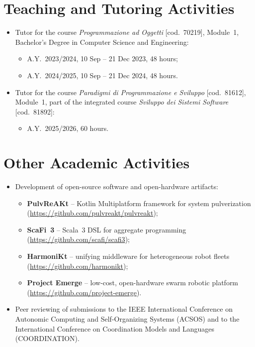\documentclass[a4paper,11pt]{article}
\begin{document}
\section{Teaching and Tutoring Activities}
\label{sec:teaching}

\begin{itemize}
  \item Tutor for the course \emph{Programmazione ad Oggetti} [cod.\ 70219], Module~1, Bachelor's Degree in Computer Science and Engineering:
  \begin{itemize}
    \item A.Y.\ 2023/2024, 10 Sep -- 21 Dec 2023, 48 hours;
    \item A.Y.\ 2024/2025, 10 Sep -- 21 Dec 2024, 48 hours.
  \end{itemize}
  \item Tutor for the course \emph{Paradigmi di Programmazione e Sviluppo} [cod.\ 81612], Module~1, part of the integrated course \emph{Sviluppo dei Sistemi Software} [cod.\ 81892]:
  \begin{itemize}
    \item A.Y.\ 2025/2026, 60 hours.
  \end{itemize}
\end{itemize}

\section{Other Academic Activities}
\label{sec:other}

\begin{itemize}
  \item Development of open-source software and open-hardware artifacts:
  \begin{itemize}
    \item \textbf{PulvReAKt} -- Kotlin Multiplatform framework for system pulverization (\url{https://github.com/pulvreakt/pulvreakt});
    \item \textbf{ScaFi~3} -- Scala~3 DSL for aggregate programming (\url{https://github.com/scafi/scafi3});
    \item \textbf{HarmoniKt} -- unifying middleware for heterogeneous robot fleets~\cite{DBLP:conf/ccnc/AndruccioliCDFDPVV26} (\url{https://github.com/harmonikt});
    \item \textbf{Project Emerge} -- low-cost, open-hardware swarm robotic platform~\cite{farabegoli2027emerge} (\url{https://github.com/project-emerge}).
  \end{itemize}
  \item Peer reviewing of submissions to the IEEE International Conference on Autonomic Computing and Self-Organizing Systems (ACSOS) and to the International Conference on Coordination Models and Languages (COORDINATION).
\end{itemize}
\end{document}
